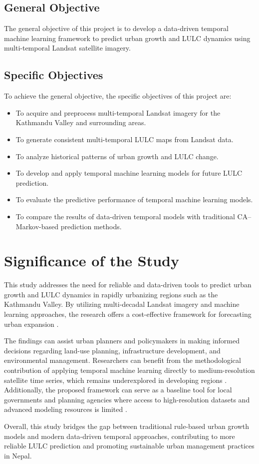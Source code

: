 \documentclass[main]{subfiles}
\begin{document}
\subsection*{General Objective}

The general objective of this project is to develop a data-driven temporal machine learning framework to predict urban growth and LULC dynamics using multi-temporal Landsat satellite imagery.

\subsection*{Specific Objectives}

To achieve the general objective, the specific objectives of this project are:

\begin{itemize}
\item To acquire and preprocess multi-temporal Landsat imagery for the Kathmandu Valley and surrounding areas.
\item To generate consistent multi-temporal LULC maps from Landsat data.
\item To analyze historical patterns of urban growth and LULC change.
\item To develop and apply temporal machine learning models for future LULC prediction.
\item To evaluate the predictive performance of temporal machine learning models.
\item To compare the results of data-driven temporal models with traditional CA--Markov-based prediction methods.
\end{itemize}

\section{Significance of the Study}

This study addresses the need for reliable and data-driven tools to predict urban growth and LULC dynamics in rapidly urbanizing regions such as the Kathmandu Valley. By utilizing multi-decadal Landsat imagery and machine learning approaches, the research offers a cost-effective framework for forecasting urban expansion \cite{wang2020land}.

The findings can assist urban planners and policymakers in making informed decisions regarding land-use planning, infrastructure development, and environmental management. Researchers can benefit from the methodological contribution of applying temporal machine learning directly to medium-resolution satellite time series, which remains underexplored in developing regions \cite{tiwari2025}. Additionally, the proposed framework can serve as a baseline tool for local governments and planning agencies where access to high-resolution datasets and advanced modeling resources is limited \cite{nagasa2025}.

Overall, this study bridges the gap between traditional rule-based urban growth models and modern data-driven temporal approaches, contributing to more reliable LULC prediction and promoting sustainable urban management practices in Nepal.
\end{document}
